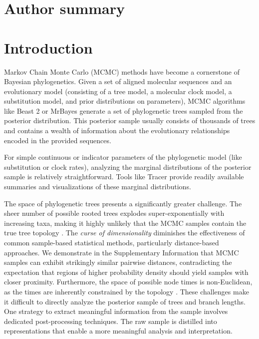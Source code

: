 \documentclass[10pt,letterpaper]{article}
\begin{document}
\section*{Author summary}


\linenumbers

\section*{Introduction}

Markov Chain Monte Carlo (MCMC) methods have become a cornerstone of Bayesian phylogenetics. Given a set of aligned molecular sequences and an evolutionary model (consisting of a tree model, a molecular clock model, a substitution model, and prior distributions on parameters), MCMC algorithms like Beast 2 \cite{beast2} or MrBayes \cite{mrbayes} generate a set of phylogenetic trees sampled from the posterior distribution. This posterior sample usually consists of thousands of trees and contains a wealth of information about the evolutionary relationships encoded in the provided sequences.

For simple continuous or indicator parameters of the phylogenetic model (like substitution or clock rates), analyzing the marginal distributions of the posterior sample is relatively straightforward. Tools like Tracer \cite{tracer} provide readily available summaries and visualizations of these marginal distributions.

The space of phylogenetic trees presents a significantly greater challenge. The sheer number of possible rooted trees explodes super-exponentially with increasing taxa, making it highly unlikely that the MCMC samples contain the true tree topology \cite{ccd}. The \emph{curse of dimensionality} \cite{curse,curse2} diminishes the effectiveness of common sample-based statistical methods, particularly distance-based approaches. We demonstrate in the Supplementary Information that MCMC samples can exhibit strikingly similar pairwise distances, contradicting the expectation that regions of higher probability density should yield samples with closer proximity. Furthermore, the space of possible node times is non-Euclidean, as the times are inherently constrained by the topology \cite{wald,tauspace,tropical,bhv}. These challenges make it difficult to directly analyze the posterior sample of trees and branch lengths. One strategy to extract meaningful information from the sample involves dedicated post-processing techniques. The raw sample is distilled into representations that enable a more meaningful analysis and interpretation.
\end{document}
